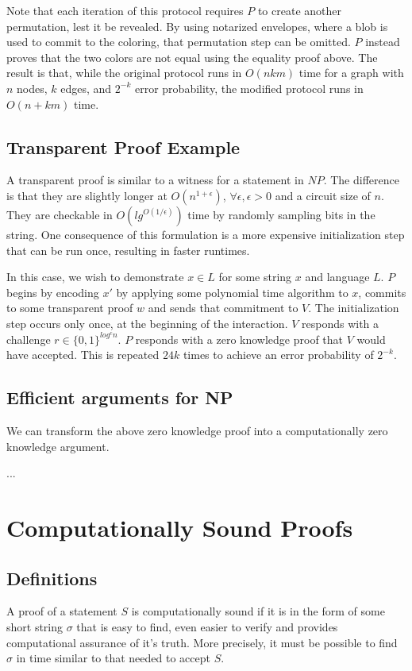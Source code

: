 \documentclass{article}
\begin{document}
Note that each iteration of this protocol requires $P$
to create another permutation, lest it be revealed. By using notarized
envelopes, where a blob is used to commit to the coloring, that
permutation step can be omitted. $P$
instead proves that the two colors are not equal using the equality
proof above. The result is that, while the original protocol runs in
$O(nkm)$
time for a graph with $n$
nodes, $k$
edges, and $2^{-k}$
error probability, the modified protocol runs in $O(n+km)$ time.

\subsection{Transparent Proof Example}

A transparent proof is similar to a witness for a statement in
$NP$.
The difference is that they are slightly longer at
$O(n^{1+\epsilon})$,
$\forall \epsilon, \epsilon > 0$
and a circuit size of $n$.
They are checkable in $O(lg^{O(1/\epsilon)})$
time by randomly sampling bits in the string. One consequence of this
formulation is a more expensive initialization step that can be run
once, resulting in faster runtimes.

In this case, we wish to demonstrate $x \in L$
for some string $x$
and language $L$.
$P$
begins by encoding $x'$
by applying some polynomial time algorithm to $x$,
commits to some transparent proof $w$
and sends that commitment to $V$.
The initialization step occurs only once, at the beginning of the
interaction. $V$
responds with a challenge $r \in \{0,1\}^{log^cn}$.
$P$
responds with a zero knowledge proof that $V$
would have accepted. This is repeated $24k$
times to achieve an error probability of $2^{-k}$.

\subsection{Efficient arguments for NP}

We can transform the above zero knowledge proof into a computationally zero knowledge argument.

...

\section{Computationally Sound Proofs}

\subsection{Definitions}
A proof of a statement $S$ is computationally sound if it is in the form of some short string $\sigma$ that is easy to find, even easier to verify and provides computational assurance of it's truth. More precisely, it must be possible to find $\sigma$ in time similar to that needed to accept $S$.
\end{document}
